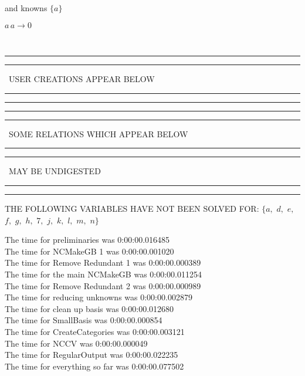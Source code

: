 \documentclass[rep10,leqno]{report}
\begin{document}
and knowns $\{a\}$\smallskip\\
\begin{minipage}{6in}
$
a\,
 a\rightarrow 0
$
\end{minipage}\\
\rule[2pt]{6in}{1pt}\hfil\break
\rule[2.5pt]{1.701in}{1pt}
\ USER CREATIONS APPEAR BELOW\ 
\rule[2.5pt]{1.701in}{1pt}\hfil\break
\rule[2pt]{6in}{1pt}\hfil\break
\rule[2pt]{6in}{4pt}\hfil\break
\rule[2pt]{1.45in}{4pt}
\ SOME RELATIONS WHICH APPEAR BELOW\ 
\rule[2pt]{1.45in}{4pt}\hfil\break
\rule[2pt]{2.18in}{4pt}
\ MAY BE UNDIGESTED\ 
\rule[2pt]{2.18in}{4pt}\hfil\break
\rule[2pt]{6in}{4pt}\hfil\break
THE FOLLOWING VARIABLES HAVE NOT BEEN SOLVED FOR:\hfil\break
$\{a,
$ $
d,
$ $
e,
$ $
f,
$ $
g,
$ $
h,
$ $
7,
$ $
j,
$ $
k,
$ $
l,
$ $
m,
$ $
n\}$
\smallskip\\
\vspace{10pt}

\noindent
The time for preliminaries was 0:00:00.016485\\
The time for NCMakeGB 1 was 0:00:00.001020\\
The time for Remove Redundant 1 was 0:00:00.000389\\
The time for the main NCMakeGB was 0:00:00.011254\\
The time for Remove Redundant 2 was 0:00:00.000989\\
The time for reducing unknowns was 0:00:00.002879\\
The time for clean up basis was 0:00:00.012680\\
The time for SmallBasis was 0:00:00.000854\\
The time for CreateCategories was 0:00:00.003121\\
The time for NCCV was 0:00:00.000049\\
The time for RegularOutput was 0:00:00.022235\\
The time for everything so far was 0:00:00.077502\\
\end{document}
